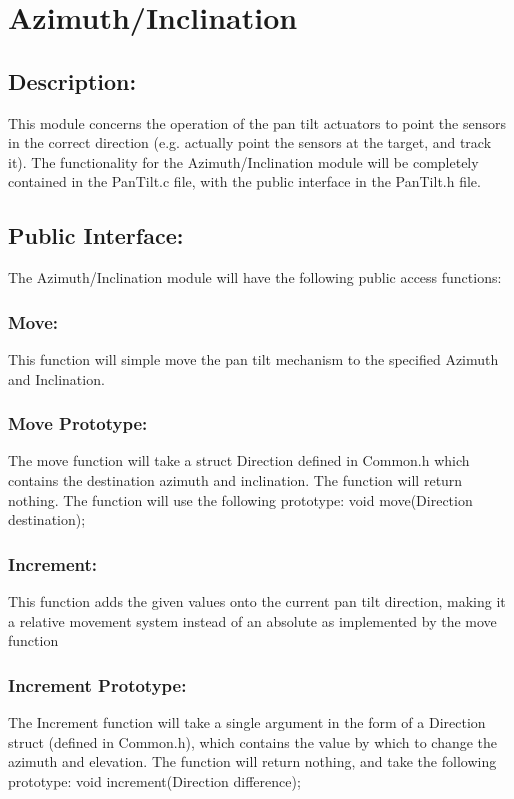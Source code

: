 \documentclass[]{article}
\begin{document}
\newpage
\section{Azimuth/Inclination}

\subsection{Description:}
This module concerns the operation of the pan tilt actuators to point the sensors in the correct direction (e.g. actually point the sensors at the target, and track it). The functionality for the Azimuth/Inclination module will be completely contained in the PanTilt.c file, with the public interface in the PanTilt.h file.

\subsection{Public Interface:}
The Azimuth/Inclination module will have the following public access functions:

\subsubsection{Move:}
This function will simple move the pan tilt mechanism to the specified Azimuth and Inclination.

\subsubsection{Move Prototype:}
The move function will take a struct Direction defined in Common.h which contains the destination azimuth and inclination. The function will return nothing. The function will use the following prototype: \newline \newline 
void move(Direction destination);

\subsubsection{Increment:}
This function adds the given values onto the current pan tilt direction, making it a relative movement system instead of an absolute as implemented by the move function

\subsubsection{Increment Prototype:}
The Increment function will take a single argument in the form of a Direction struct (defined in Common.h), which contains the value by which to change the azimuth and elevation. The function will return nothing, and take the following prototype: \newline \newline
void increment(Direction difference);
\end{document}
